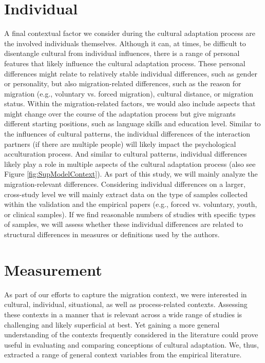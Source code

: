 \documentclass[man, 12pt, a4paper]{apa7}
\begin{document}
\section{Individual} 
A final contextual factor we consider during the cultural adaptation process are the involved individuals themselves. Although it can, at times, be difficult to disentangle cultural from individual influences, there is a range of personal features that likely influence the cultural adaptation process. These personal differences might relate to relatively stable individual differences, such as gender or personality, but also migration-related differences, such as the reason for migration (e.g., voluntary vs. forced migration), cultural distance, or migration status. Within the migration-related factors, we would also include aspects that might change over the course of the adaptation process but give migrants different starting positions, such as language skills and education level.
Similar to the influences of cultural patterns, the individual differences of the interaction partners (if there are multiple people) will likely impact the psychological acculturation process. And similar to cultural patterns, individual differences likely play a role in multiple aspects of the cultural adaptation process (also see Figure \ref{fig:SupModelContext}). As part of this study, we will mainly analyze the migration-relevant differences. Considering individual differences on a larger, cross-study level we will mainly extract data on the type of samples collected within the validation and the empirical papers (e.g., forced vs. voluntary, youth, or clinical samples). If we find reasonable numbers of studies with specific types of samples, we will assess whether these individual differences are related to structural differences in measures or definitions used by the authors.

\section{Measurement}
As part of our efforts to capture the migration context, we were interested in cultural, individual, situational, as well as process-related contexts. Assessing these contexts in a manner that is relevant across a wide range of studies is challenging and likely superficial at best. Yet gaining a more general understanding of the contexts frequently considered in the literature could prove useful in evaluating and comparing conceptions of cultural adaptation. We, thus, extracted a range of general context variables from the empirical literature.
\end{document}
